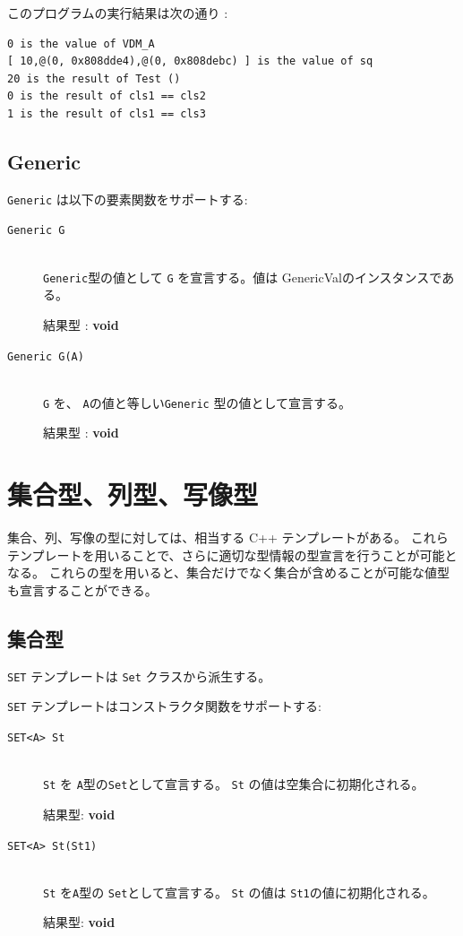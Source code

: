 \documentclass[\pformat,12pt]{jarticle}
\begin{document}
\noindent このプログラムの実行結果は次の通り :

\begin{verbatim}
0 is the value of VDM_A
[ 10,@(0, 0x808dde4),@(0, 0x808debc) ] is the value of sq
20 is the result of Test ()
0 is the result of cls1 == cls2
1 is the result of cls1 == cls3
\end{verbatim}



\subsection{Generic}

{\tt Generic} は以下の要素関数をサポートする:

\vspace{0.5cm}

\begin{description}
\item[{\tt Generic G}] \mbox{}\\
      {\tt Generic}型の値として {\tt G} を宣言する。値は GenericValのインスタンスである。

     結果型 : {\bf void}

\item[{\tt Generic G(A)}] \mbox{}\\
      {\tt G} を、 {\tt A}の値と等しい{\tt Generic} 型の値として宣言する。

     結果型 : {\bf void}

\end{description}     

\section{集合型、列型、写像型}\label{templates}

集合、列、写像の型に対しては、相当する C++ テンプレートがある。
これらテンプレートを用いることで、さらに適切な型情報の型宣言を行うことが可能となる。
これらの型を用いると、集合だけでなく集合が含めることが可能な値型も宣言することができる。

\subsection{集合型}

 {\tt SET} テンプレートは {\tt Set} クラスから派生する。

 {\tt SET} テンプレートはコンストラクタ関数をサポートする:

\begin{description}
\item[{\tt SET<A> St}] \mbox{}\\
{\tt St} を {\tt A}型の{\tt Set}として宣言する。  {\tt St} の値は空集合に初期化される。

結果型: {\bf void}

\item[{\tt SET<A> St(St1)}] \mbox{} \\
 {\tt St} を{\tt A}型の {\tt Set}として宣言する。  {\tt St} の値は {\tt St1}の値に初期化される。

結果型: {\bf void}

\end{description}
\end{document}

